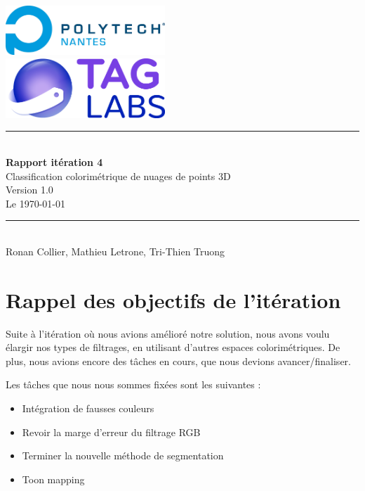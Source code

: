 \documentclass[12pt,titlepage,french]{article}
\begin{document}

\begin{titlepage}
\newcommand{\HRule}{\rule{\linewidth}{0.5mm}}
\center

  \includegraphics[width=0.45\textwidth]{../../ressources/img_logos/logo_polytech.png}\\[1cm]

  \includegraphics[width=0.45\textwidth]{../../ressources/img_logos/logo_taglabs.png}


\HRule \\[0.4cm]
{ \huge \bfseries Rapport itération 4\\[0.15cm] }
Classification colorimétrique de nuages de points 3D\\
Version 1.0\\
Le \today \\
\HRule \\[1.5cm]
Ronan Collier,
Mathieu Letrone,
Tri-Thien Truong
\\[1cm]
\end{titlepage}

\tableofcontents %
\newpage
\listoffigures  %
\newpage

\section{Rappel des objectifs de l'itération}
Suite à l'itération où nous avions amélioré notre solution, nous avons voulu élargir nos types de filtrages, en utilisant d'autres espaces colorimétriques. De plus, nous avions encore des tâches en cours, que nous devions avancer/finaliser.

Les tâches que nous nous sommes fixées sont les suivantes :

\begin{itemize}
  \item Intégration de fausses couleurs
  \item Revoir la marge d'erreur du filtrage RGB
  \item Terminer la nouvelle méthode de segmentation
  \item Toon mapping \newline
\end{itemize}
\end{document}
